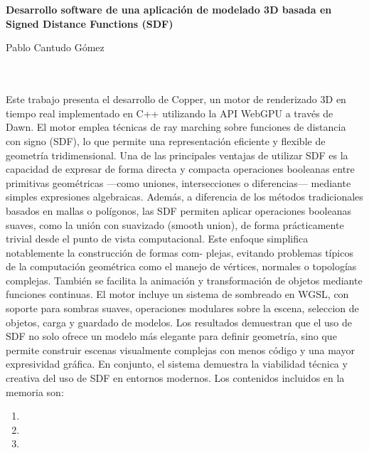 \chapter*{}


\cleardoublepage
\thispagestyle{empty}

\begin{center}
{\large\bfseries Desarrollo software de una aplicación de modelado 3D
basada en Signed Distance Functions (SDF)}\\
\end{center}
\begin{center}
Pablo Cantudo Gómez\\
\end{center}

\\

\vspace{0.7cm}
\\

Este trabajo presenta el desarrollo de Copper, un motor de renderizado 3D en
tiempo real implementado en C++ utilizando la API WebGPU a través de
Dawn. El motor emplea técnicas de ray marching sobre funciones de distancia
con signo (SDF), lo que permite una representación eficiente y flexible de
geometría tridimensional. Una de las principales ventajas de utilizar SDF es
la capacidad de expresar de forma directa y compacta operaciones booleanas
entre primitivas geométricas —como uniones, intersecciones o diferencias—
mediante simples expresiones algebraicas. Además, a diferencia de los métodos
tradicionales basados en mallas o polígonos, las SDF permiten aplicar
operaciones booleanas suaves, como la unión con suavizado (smooth union),
de forma prácticamente trivial desde el punto de vista computacional.
\bigbreak
Este enfoque simplifica notablemente la construcción de formas com-
plejas, evitando problemas típicos de la computación geométrica como el
manejo de vértices, normales o topologías complejas. También se facilita
la animación y transformación de objetos mediante funciones continuas. El
motor incluye un sistema de sombreado en WGSL, con soporte para sombras
suaves, operaciones modulares sobre la escena, seleccion de objetos, carga
y guardado de modelos. Los resultados demuestran que el uso de SDF no
solo ofrece un modelo más elegante para definir geometría, sino que permite
construir escenas visualmente complejas con menos código y una mayor expresividad gráfica.
En conjunto, el sistema demuestra la viabilidad técnica
y creativa del uso de SDF en entornos modernos.
\bigbreak
Los contenidos incluidos en la memoria son:
\begin{enumerate}
    \item   
    \item  
    \item 
\end{enumerate}
\cleardoublepage


